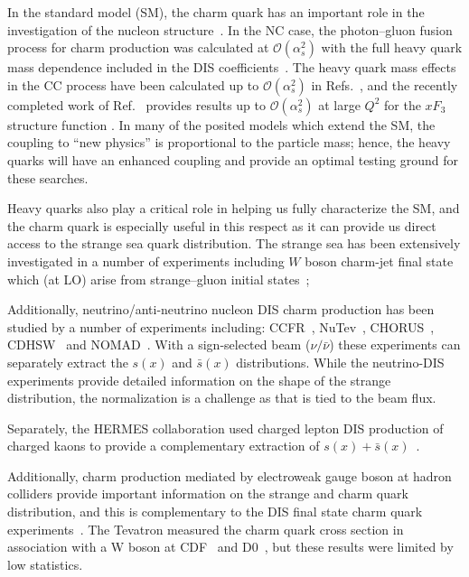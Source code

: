 \documentclass[pdftex,twocolumn,epjc3]{svjour3}          %
\begin{document}
In the standard model (SM), the charm quark has an important role in the
investigation of the nucleon structure~\cite{Behnke:2015qja,Zenaiev:2016kfl,Abdolmaleki:2017wlg}.
%
In the NC case, the photon--gluon fusion process for charm production was
calculated at ${\mathcal{O}}(\alpha_s^2)$ with the full heavy quark mass dependence
included in the DIS coefficients~\cite{Laenen:1992zk,Laenen:1992xs}.
%
The heavy quark mass
effects in the CC process have been  calculated up to
${\mathcal{O}}(\alpha_s^2)$ in
Refs.~\cite{Gottschalk:1980rv,Gluck:1997sj,Blumlein:2011zu,Buza:1997mg,Blumlein:2014fqa}, 
and the recently completed work of Ref.~\cite{Berger:2016inr} provides results 
up to ${\mathcal{O}}(\alpha_s^2)$ at large $Q^2$ for the
$xF_3$ structure function \cite{Behring:2015roa}.
%
%
In many of the posited models which extend the SM, the coupling to
``new physics'' is proportional to the particle mass; hence, the heavy
quarks will have an enhanced coupling and provide an optimal testing
ground for these searches.

Heavy quarks also play a critical role in helping us fully
characterize the SM, and the charm quark is especially useful in this
respect as it can provide us direct access to the strange sea quark
distribution.
%
The strange sea has been extensively investigated in a number of
experiments including $W$ boson charm-jet final state which (at LO)
arise from strange--gluon initial states~\cite{Abazov:2014fka,
  Lai:2007dq};
%

Additionally, neutrino/anti-neutrino nucleon DIS charm production has
been studied by a number of experiments including:
%
 CCFR~\cite{Seligman:1997mc},
 NuTev~\cite{Tzanov:2005kr},
 CHORUS~\cite{Onengut:2005kv},
 CDHSW~\cite{Berge:1989hr}
 and
 NOMAD~\cite{Samoylov:2013xoa}.
%
With a sign-selected beam ($\nu/\bar{\nu}$) these experiments can
separately extract the $s(x)$ and $\bar{s}(x)$ distributions. While
the neutrino-DIS experiments provide detailed information on the shape
of the strange distribution, the normalization is a challenge as that
is tied to the beam flux.

Separately, the HERMES collaboration used charged lepton DIS
production of charged kaons to provide a complementary extraction of
$s(x)+ \bar{s}(x)$~\cite{Airapetian:2008qf}.



Additionally,  charm production mediated by electroweak gauge
boson at hadron colliders provide important information on the strange and
charm quark distribution, and this is complementary to the DIS final state charm
quark experiments~\cite{Lai:2007dq}.
%
The Tevatron  measured the charm quark cross
section in association with  a W boson
at CDF~\cite{Aaltonen:2007dm}  and D0~\cite{Abazov:2008qz}, 
but these results were  limited by low statistics.
\end{document}

